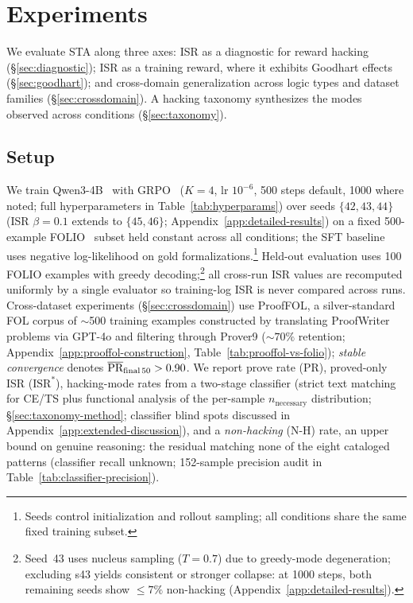 \section{Experiments}
\label{sec:experiments}

We evaluate STA along three axes: ISR as a diagnostic for reward hacking (\S\ref{sec:diagnostic}); ISR as a training reward, where it exhibits Goodhart effects (\S\ref{sec:goodhart}); and cross-domain generalization across logic types and dataset families (\S\ref{sec:crossdomain}).
A hacking taxonomy synthesizes the modes observed across conditions (\S\ref{sec:taxonomy}).

\subsection{Setup}\label{sec:setup}

We train Qwen3-4B~\citep{qwen3} with GRPO~\citep{deepseekmath} ($K{=}4$, lr $10^{-6}$, 500 steps default, 1000 where noted; full hyperparameters in Table~\ref{tab:hyperparams}) over seeds $\{42,43,44\}$ (ISR $\beta{=}0.1$ extends to $\{45,46\}$; Appendix~\ref{app:detailed-results}) on a fixed 500-example FOLIO~\citep{folio} subset held constant across all conditions; the SFT baseline uses negative log-likelihood on gold formalizations.\footnote{Seeds control initialization and rollout sampling; all conditions share the same fixed training subset.}
Held-out evaluation uses 100 FOLIO examples with greedy decoding;\footnote{Seed~43 uses nucleus sampling ($T{=}0.7$) due to greedy-mode degeneration; excluding s43 yields consistent or stronger collapse: at 1000 steps, both remaining seeds show ${\leq}7\%$ non-hacking (Appendix~\ref{app:detailed-results}).} all cross-run ISR values are recomputed uniformly by a single evaluator so training-log ISR is never compared across runs.
Cross-dataset experiments (\S\ref{sec:crossdomain}) use ProofFOL, a silver-standard FOL corpus of ${\sim}$500 training examples constructed by translating ProofWriter~\citep{proofwriter} problems via GPT-4o and filtering through Prover9 (${\sim}70\%$ retention; Appendix~\ref{app:prooffol-construction}, Table~\ref{tab:prooffol-vs-folio}); \emph{stable convergence} denotes $\overline{\text{PR}}_{\text{final\,50}} > 0.90$.
We report prove rate (PR), proved-only ISR ($\text{ISR}^*$), hacking-mode rates from a two-stage classifier (strict text matching for CE/TS plus functional analysis of the per-sample $n_{\text{necessary}}$ distribution; \S\ref{sec:taxonomy-method}; classifier blind spots discussed in Appendix~\ref{app:extended-discussion}), and a \emph{non-hacking} (N-H) rate, an upper bound on genuine reasoning: the residual matching none of the eight cataloged patterns (classifier recall unknown; 152-sample precision audit in Table~\ref{tab:classifier-precision}).

